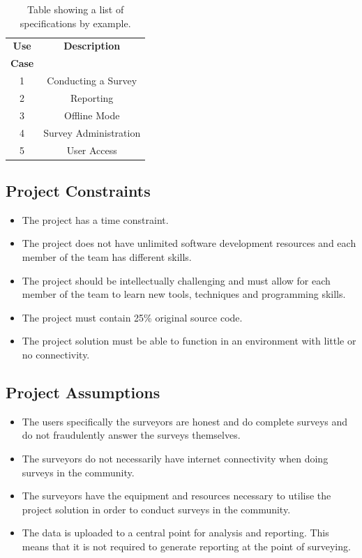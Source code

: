 \documentclass[12pt]{witseiepaper}
\begin{document}
\begin{table}[htb] \caption{Table showing a list of specifications by example.} \label{tbl:use} 
    \begin{center}
  \begin{tabular}
    {|c|c|} \hline \textbf{Use} &\textbf{Description}\\
    \textbf{Case} &\\
    \hline 1 &Conducting a Survey\\
    \hline 2 &Reporting\\
    \hline 3 &Offline Mode\\
    \hline 4 &Survey Administration\\
    \hline 5 &User Access\\
    \hline 
  \end{tabular}
      \end{center}
\end{table}

\subsection{Project Constraints}
\begin{itemize}
  \item The project has a time constraint. 
  \item The project does not have unlimited software development resources and each member of the team has different skills. 
  \item The project should be intellectually challenging and must allow for each member of the team to learn new tools, techniques and programming skills.
  \item The project must contain 25\% original source code.
  \item The project solution must be able to function in an environment with little or no connectivity.
\end{itemize}

\subsection{Project Assumptions}
\begin{itemize}
  \item The users specifically the surveyors are honest and do complete surveys and do not fraudulently answer the surveys themselves.
  \item The surveyors do not necessarily have internet connectivity when doing surveys in the community.
  \item The surveyors have the equipment and resources necessary to utilise the project solution in order to conduct surveys in the community.
  \item The data is uploaded to a central point for analysis and reporting. This means that it is not required to generate reporting at the point of surveying.
\end{itemize}
\end{document}
